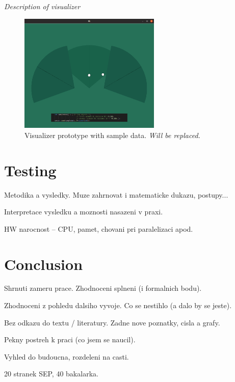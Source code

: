 {\it Description of visualizer}

\begin{figure}[h!]
\begin{center}
\includegraphics[width=0.6\textwidth]{obrazky-figures/visualizer.png}
\caption{Visualizer prototype with sample data. {\it Will be replaced.} \label{fig:visualizer}}
\end{center}
\end{figure}


\chapter{Testing}
Metodika a vysledky. Muze zahrnovat i matematicke dukazu, postupy...

Interpretace vysledku a moznosti nasazeni v praxi.

HW narocnost -- CPU, pamet, chovani pri paralelizaci apod.




\chapter{Conclusion}
Shrnuti zameru prace. Zhodnoceni splneni (i formalnich bodu).

Zhodnoceni z pohledu dalsiho vyvoje. Co se nestihlo (a dalo by se jeste).

Bez odkazu do textu / literatury. Zadne nove poznatky, cisla a grafy.

Pekny postreh k praci (co jsem se naucil).

Vyhled do budoucna, rozdeleni na casti.

20 stranek SEP, 40 bakalarka.




